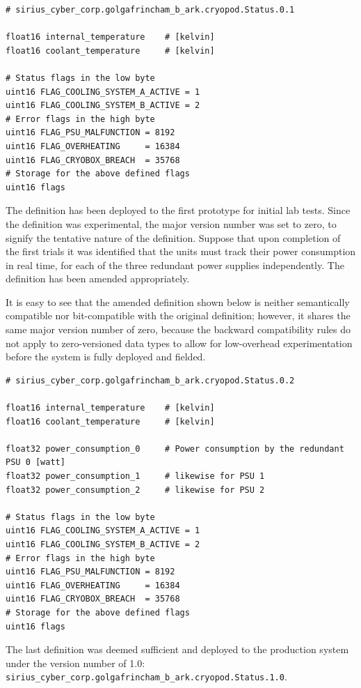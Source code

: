 \begin{verbatim}
# sirius_cyber_corp.golgafrincham_b_ark.cryopod.Status.0.1

float16 internal_temperature    # [kelvin]
float16 coolant_temperature     # [kelvin]

# Status flags in the low byte
uint16 FLAG_COOLING_SYSTEM_A_ACTIVE = 1
uint16 FLAG_COOLING_SYSTEM_B_ACTIVE = 2
# Error flags in the high byte
uint16 FLAG_PSU_MALFUNCTION = 8192
uint16 FLAG_OVERHEATING     = 16384
uint16 FLAG_CRYOBOX_BREACH  = 35768
# Storage for the above defined flags
uint16 flags
\end{verbatim}

The definition has been deployed to the first prototype for initial lab tests.
Since the definition was experimental, the major version number was set to zero, to signify the
tentative nature of the definition.
Suppose that upon completion of the first trials it was identified that the units must track their power consumption
in real time, for each of the three redundant power supplies independently.
The definition has been amended appropriately.

It is easy to see that the amended definition shown below is neither semantically compatible nor bit-compatible
with the original definition; however, it shares the same major version number of zero, because the backward
compatibility rules do not apply to zero-versioned data types to allow for low-overhead experimentation
before the system is fully deployed and fielded.

\begin{verbatim}
# sirius_cyber_corp.golgafrincham_b_ark.cryopod.Status.0.2

float16 internal_temperature    # [kelvin]
float16 coolant_temperature     # [kelvin]

float32 power_consumption_0     # Power consumption by the redundant PSU 0 [watt]
float32 power_consumption_1     # likewise for PSU 1
float32 power_consumption_2     # likewise for PSU 2

# Status flags in the low byte
uint16 FLAG_COOLING_SYSTEM_A_ACTIVE = 1
uint16 FLAG_COOLING_SYSTEM_B_ACTIVE = 2
# Error flags in the high byte
uint16 FLAG_PSU_MALFUNCTION = 8192
uint16 FLAG_OVERHEATING     = 16384
uint16 FLAG_CRYOBOX_BREACH  = 35768
# Storage for the above defined flags
uint16 flags
\end{verbatim}

The last definition was deemed sufficient and deployed to the production system
under the version number of 1.0: \verb|sirius_cyber_corp.golgafrincham_b_ark.cryopod.Status.1.0|.

